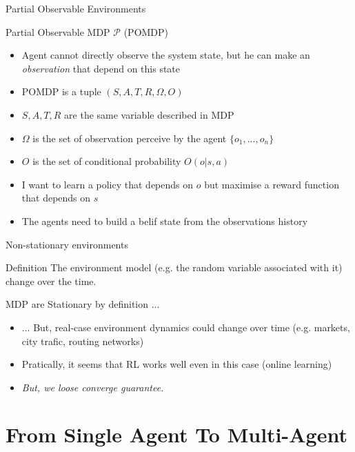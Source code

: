 \documentclass[presentation]{beamer}\mode<presentation>{\usetheme{AMSBolognaFC}}
\begin{document}
\begin{frame}{Partial Observable Environments}
	\begin{exampleblock}{Partial Observable MDP $\mathcal{P}$ (POMDP) \href{https://www.pomdp.org/}{\faLink}}
		\begin{itemize}
			\item Agent cannot directly observe the system state, but he can make an \emph{observation} that depend on this state
			\item POMDP is a tuple $(S, A, T, R, \Omega, O)$
			\item $S, A, T, R$ are the same variable described in MDP
			\item $\Omega$ is the set of observation perceive by the agent $\{o_1, ..., o_n\}$
			\item $O$ is the set of conditional probability $O(o | s, a)$
			\item I want to learn a policy that depends on $o$ but maximise a reward function that depends on $s$
			\item The agents need to build a belif state from the observations history
		\end{itemize}
	\end{exampleblock}
\end{frame}
\begin{frame}[c]{Non-stationary environments}
	\begin{alertblock}{Definition}
		The environment model (e.g. the random variable associated with it) change 
		over the time.
	\end{alertblock}
	\begin{exampleblock}{MDP are Stationary by definition ...}
		\begin{itemize}
			\item ... But, real-case environment dynamics could change over time (e.g. markets, city trafic, routing networks)
			\item Pratically, it seems that RL works well even in this case (online learning)
			\item \emph{But, we loose converge guarantee.}
		\end{itemize}
	\end{exampleblock}
%
\end{frame}

\section{From Single Agent To Multi-Agent}
\end{document}
